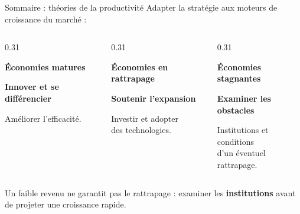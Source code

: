 \documentclass[aspectratio=169]{beamer}
\begin{document}
\begin{frame}[t]{Sommaire : théories de la productivité}
   \small
   Adapter la stratégie aux moteurs de croissance du marché :
   \vspace{0.35cm}
   \begin{columns}[T,onlytextwidth]
      \begin{column}{0.31\textwidth}
         \begin{tcolorbox}[colback=HECgreen!8, colframe=HECgreen, boxrule=0.5pt, arc=8pt,
            height=2.55cm, top=8pt, bottom=8pt, left=6pt, right=6pt]
            \centering\footnotesize\textbf{Économies matures}\par\vspace{0.25cm}
            \textbf{Innover et se différencier}\par\vspace{0.1cm}
            Améliorer l'efficacité.
         \end{tcolorbox}
      \end{column}
      \begin{column}{0.31\textwidth}
         \begin{tcolorbox}[colback=HECnavy!8, colframe=HECnavy, boxrule=0.5pt, arc=8pt,
            height=2.55cm, top=8pt, bottom=8pt, left=6pt, right=6pt]
            \centering\footnotesize\textbf{Économies en rattrapage}\par\vspace{0.25cm}
            \textbf{Soutenir l'expansion}\par\vspace{0.1cm}
            Investir et adopter\\des technologies.
         \end{tcolorbox}
      \end{column}
      \begin{column}{0.31\textwidth}
         \begin{tcolorbox}[colback=HECcoral!8, colframe=HECcoral, boxrule=0.5pt, arc=8pt,
            height=2.55cm, top=8pt, bottom=8pt, left=6pt, right=6pt]
            \centering\footnotesize\textbf{Économies stagnantes}\par\vspace{0.25cm}
            \textbf{Examiner les obstacles}\par\vspace{0.1cm}
            Institutions et conditions\\d'un éventuel rattrapage.
         \end{tcolorbox}
      \end{column}
   \end{columns}
   \vspace{0.35cm}
   \begin{bizimplication}
      \small\RaggedRight Un faible revenu ne garantit pas le rattrapage : examiner les \textbf{institutions} avant de projeter une croissance rapide.
   \end{bizimplication}
\end{frame}
\end{document}
